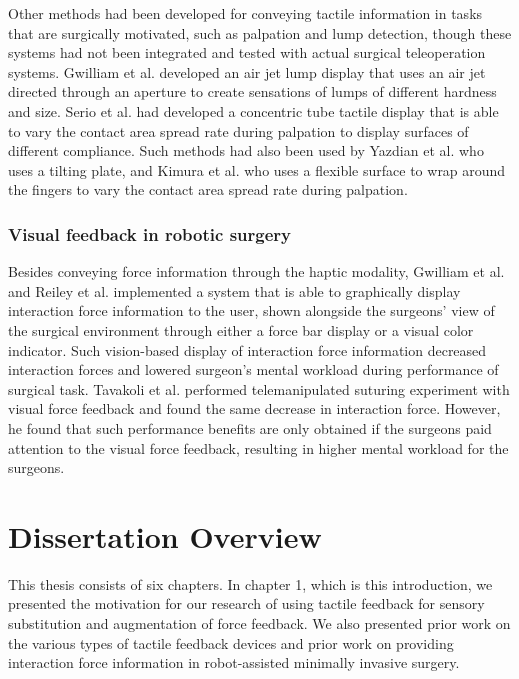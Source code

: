 Other methods had been developed for conveying tactile information in tasks that are surgically motivated, such as palpation and lump detection, though these systems had not been integrated and tested with actual surgical teleoperation systems. Gwilliam et al. \cite{Gwilliam2013} developed an air jet lump display that uses an air jet directed through an aperture to create sensations of lumps of different hardness and size. Serio et al. \cite{Serio2013} had developed a concentric tube tactile display that is able to vary the contact area spread rate during palpation to display surfaces of different compliance. Such methods had also been used by Yazdian et al. \cite{Yazdian2014} who uses a tilting plate, and Kimura et al. \cite{Kimura2010} who uses a flexible surface to wrap around the fingers to vary the contact area spread rate during palpation.

\subsubsection{Visual feedback in robotic surgery}
Besides conveying force information through the haptic modality, Gwilliam et al. \cite{Gwilliam2009} and Reiley et al. \cite{Reiley2007} implemented a system that is able to graphically display interaction force information to the user, shown alongside the surgeons' view of the surgical environment through either a force bar display or a visual color indicator. Such vision-based display of interaction force information decreased interaction forces and lowered surgeon's mental workload during performance of surgical task. Tavakoli et al. \cite{Tavakoli2005} performed telemanipulated suturing experiment with visual force feedback and found the same decrease in interaction force. However, he found that such performance benefits are only obtained if the surgeons paid attention to the visual force feedback, resulting in higher mental workload for the surgeons.

\section{Dissertation Overview}
This thesis consists of six chapters. In chapter 1, which is this introduction, we presented the motivation for our research of using tactile feedback for sensory substitution and augmentation of force feedback. We also presented prior work on the various types of tactile feedback devices and prior work on providing interaction force information in robot-assisted minimally invasive surgery.

